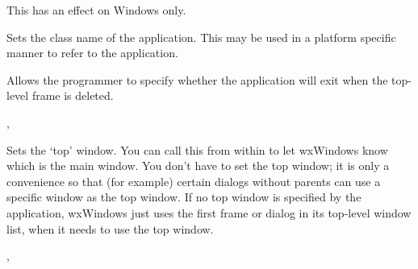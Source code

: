 
This has an effect on Windows only.




\label{wxappsetclassname}


Sets the class name of the application. This may be used in a platform specific
manner to refer to the application.




\label{wxappsetexitonframedelete}


Allows the programmer to specify whether the application will exit when the
top-level frame is deleted.




,\\


\label{wxappsettopwindow}


Sets the `top' window. You can call this from within  to
let wxWindows know which is the main window. You don't have to set the top window;
it is only a convenience so that (for example) certain dialogs without parents can use a
specific window as the top window. If no top window is specified by the application,
wxWindows just uses the first frame or dialog in its top-level window list, when it
needs to use the top window.




, 



